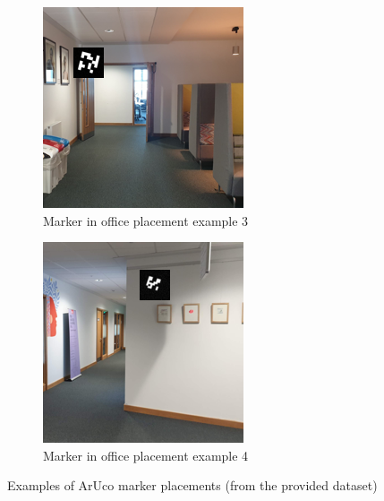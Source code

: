 \documentclass[conference]{IEEEtran}
\begin{document}
\begin{figure}[h]
  \begin{subfigure}[b]{0.2\textwidth}
      \centering
      \includegraphics[width=\textwidth]{images/aruco-file4-detection-3.png}
      \caption{Marker in office placement example 3}
      \label{fig:det_ex_3}
  \end{subfigure}
  \hfill
  \begin{subfigure}[b]{0.2\textwidth}
      \centering
      \includegraphics[width=\textwidth]{images/aruco-file4-detection-4.png}
      \caption{Marker in office placement example 4}
      \label{fig:det_ex_4}
  \end{subfigure}
  \caption{Examples of ArUco marker placements (from the provided dataset)}
  \label{fig:detection_examples}
\end{figure}
\end{document}

